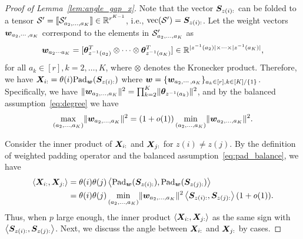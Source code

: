 \documentclass[lettersize,onecolumn,journal]{IEEEtran}
\theoremstyle{definition}
\theoremstyle{definition}
\newcommand{\ang}[1]{\left\langle#1\right\rangle}
\begin{document}
\begin{proof}[Proof of Lemma~\ref{lem:angle_gap_x}] 
Note that the vector $\bm S_{z(i):}$ can be folded to a tensor $\mathcal{S}' =\llbracket \mathcal{S}'_{a_2,\ldots,a_K} \rrbracket \in \mathbb{R}^{r^{K-1}}$, i.e., $\text{vec}(\mathcal{S}') = \bm S_{z(i):}$. Let the weight vectors $\bm{w}_{a_2, \cdots, a_K}$ correspond to the elements in $\mathcal{S}'_{a_2,\ldots,a_K}$ as
\begin{equation}
    \bm{w}_{a_2 \cdots a_K} = [ \boldsymbol{\theta}_{z^{-1} (a_2)}^T \otimes \cdots \otimes \boldsymbol{\theta}_{z^{-1} (a_K)}^T] \in \mathbb{R}^{|z^{-1} (a_2)| \times \cdots \times |z^{-1} (a_K)|},
\end{equation}
for all $a_k \in [r], k = 2,\ldots, K$, where $\otimes$ denotes the Kronecker product. Therefore, we have  $\bm X_{i:} = \theta(i) \text{Pad}_{\bm{w}}(\bm S_{z(i):})$ where $\bm{w} = \{ \bm{w}_{a_2, \cdots, a_K}\}_{a_k \in [r], k\in [K]/\{1\}}$. Specifically, we have $\lVert\bm{w}_{a_2, \ldots, a_K}\rVert^2 = \prod_{k = 2}^K \lVert \boldsymbol{\theta}_{z^{-1}(a_k)}\rVert^2$, and by the balanced assumption~\eqref{eq:degree} we have 
\begin{equation}\label{eq:pad_balance}
    \max_{(a_2,\ldots, a_K)} \onormSize{}{\mw_{a_2,\ldots, a_K}}^2 = (1 + o(1))  \min_{(a_2,\ldots, a_K)} \onormSize{}{\mw_{a_2,\ldots, a_K}}^2.
\end{equation}

Consider the inner product of $\bm X_{i:}$ and $\bm X_{j:}$ for $z(i) \neq z(j)$. By the definition of weighted padding operator and the balanced assumption~\eqref{eq:pad_balance}, we have 
\begin{align}
    \ang{\mX_{i:},\mX_{j:}} &= \theta(i) \theta(j) \ang{ \pad_{\mw}(\mS_{z(i):}), \pad_{\mw}(\mS_{z(j):} )}\\
    &= \theta(i) \theta(j) \min_{(a_2,\ldots, a_K)} \onormSize{}{\mw_{a_2,\ldots, a_K}}^2 \ang{\mS_{z(i):}, \mS_{z(j):}}(1 + o(1)).
\end{align}
Thus, when $p$ large enough, the inner product $\ang{\mX_{i:},\mX_{j:}} $ as the same sign with $\ang{\mS_{z(i):}, \mS_{z(j):}}$. Next, we discuss the angle between $\bm X_{i:}$ and $\bm X_{j:}$ by cases.


\end{proof}
\end{document}
